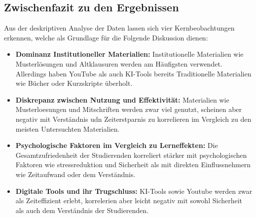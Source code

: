 \documentclass[a4paper, 12pt]{article}
\begin{document}
\subsection{Zwischenfazit zu den Ergebnissen}
Aus der deskriptiven Analyse der Daten lassen sich vier Kernbeobachtungen erkennen, welche als Grundlage für die Folgende Diskussion dienen: 
\begin{itemize}
    \item \textbf{Dominanz Institutioneller Materialien: } Institutionelle Materialien wie Musterlösungen und Altklausuren werden am Häufigsten verwendet. Allerdings haben YouTube als auch KI-Tools bereits Traditionelle Materialien wie Bücher oder Kurzskripte überholt. 
    \item \textbf{Diskrepanz zwischen Nutzung und Effektivität: } Materialien wie Musterloesungen und Mitschriften werden zwar viel genutzt, scheinen aber negativ mit Verständnis udn Zeiterstparnis zu korrelieren im Vergleich zu den meisten Untersuchten Materialien. 
    \item \textbf{Psychologische Faktoren im Vergleich zu Lerneffekten: } Die Gesamtzufriedenheit der Studierenden korreliert stärker mit psychologischen Faktoren wie stressreduktion und Sicherheit als mit direkten Einflussnehmern wie Zeitaufwand oder dem Verständnis. 
    \item \textbf{Digitale Tools und ihr Trugschluss: } KI-Tools sowie Youtube werden zwar als Zeiteffizient erlebt, korrelerien aber leicht negativ mit sowohl Sicherheit als auch dem Verständnis der Studierenden. 
\end{itemize}

\end{document}

